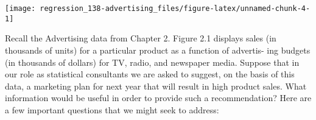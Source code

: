 \documentclass[]{book}
\newenvironment{Shaded}{\begin{snugshade}}{\end{snugshade}}
\newcommand{\DataTypeTok}[1]{\textcolor[rgb]{0.13,0.29,0.53}{#1}}
\newcommand{\DecValTok}[1]{\textcolor[rgb]{0.00,0.00,0.81}{#1}}
\newcommand{\KeywordTok}[1]{\textcolor[rgb]{0.13,0.29,0.53}{\textbf{#1}}}
\newcommand{\NormalTok}[1]{#1}
\newcommand{\OperatorTok}[1]{\textcolor[rgb]{0.81,0.36,0.00}{\textbf{#1}}}
\newcommand{\StringTok}[1]{\textcolor[rgb]{0.31,0.60,0.02}{#1}}
\begin{document}
\begin{Shaded}
\end{Shaded}

\begin{center}\texttt{[image: regression\_138-advertising\_files/figure-latex/unnamed-chunk-4-1]} \end{center}

Recall the Advertising data from Chapter 2. Figure 2.1 displays sales
(in thousands of units) for a particular product as a function of advertis-
ing budgets (in thousands of dollars) for TV, radio, and newspaper media.
Suppose that in our role as statistical consultants we are asked to suggest,
on the basis of this data, a marketing plan for next year that will result in
high product sales. What information would be useful in order to provide
such a recommendation? Here are a few important questions that we might
seek to address:
\end{document}
